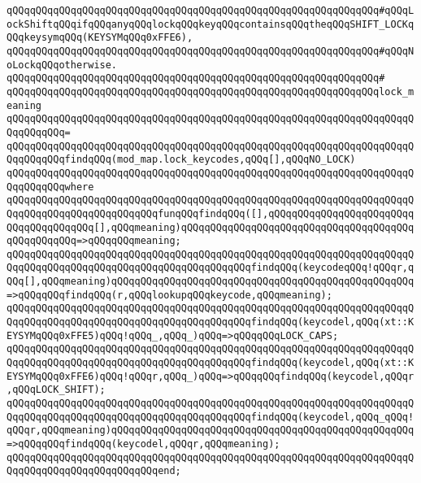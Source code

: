 \verb|qQQqqQQqqQQqqQQqqQQqqQQqqQQqqQQqqQQqqQQqqQQqqQQqqQQqqQQqqQQqqQQq#qQQqLockShiftqQQqifqQQqanyqQQqlockqQQqkeyqQQqcontainsqQQqtheqQQqSHIFT_LOCKqQQqkeysymqQQq(KEYSYMqQQq0xFFE6),|\newline
\verb|qQQqqQQqqQQqqQQqqQQqqQQqqQQqqQQqqQQqqQQqqQQqqQQqqQQqqQQqqQQqqQQq#qQQqNoLockqQQqotherwise.|\newline
\verb|qQQqqQQqqQQqqQQqqQQqqQQqqQQqqQQqqQQqqQQqqQQqqQQqqQQqqQQqqQQqqQQq#|\newline
\verb|qQQqqQQqqQQqqQQqqQQqqQQqqQQqqQQqqQQqqQQqqQQqqQQqqQQqqQQqqQQqqQQqlock_meaning|\newline
\verb|qQQqqQQqqQQqqQQqqQQqqQQqqQQqqQQqqQQqqQQqqQQqqQQqqQQqqQQqqQQqqQQqqQQqqQQqqQQqqQQq=|\newline
\verb|qQQqqQQqqQQqqQQqqQQqqQQqqQQqqQQqqQQqqQQqqQQqqQQqqQQqqQQqqQQqqQQqqQQqqQQqqQQqqQQqfindqQQq(mod_map.lock_keycodes,qQQq[],qQQqNO_LOCK)|\newline
\verb|qQQqqQQqqQQqqQQqqQQqqQQqqQQqqQQqqQQqqQQqqQQqqQQqqQQqqQQqqQQqqQQqqQQqqQQqqQQqqQQqwhere|\newline
\verb|qQQqqQQqqQQqqQQqqQQqqQQqqQQqqQQqqQQqqQQqqQQqqQQqqQQqqQQqqQQqqQQqqQQqqQQqqQQqqQQqqQQqqQQqqQQqqQQqfunqQQqfindqQQq([],qQQqqQQqqQQqqQQqqQQqqQQqqQQqqQQqqQQqqQQq[],qQQqmeaning)qQQqqQQqqQQqqQQqqQQqqQQqqQQqqQQqqQQqqQQqqQQqqQQqqQQq=>qQQqqQQqmeaning;|\newline
\verb|qQQqqQQqqQQqqQQqqQQqqQQqqQQqqQQqqQQqqQQqqQQqqQQqqQQqqQQqqQQqqQQqqQQqqQQqqQQqqQQqqQQqqQQqqQQqqQQqqQQqqQQqqQQqqQQqfindqQQq(keycodeqQQq!qQQqr,qQQq[],qQQqmeaning)qQQqqQQqqQQqqQQqqQQqqQQqqQQqqQQqqQQqqQQqqQQqqQQqqQQq=>qQQqqQQqfindqQQq(r,qQQqlookupqQQqkeycode,qQQqmeaning);|\newline
\verb|qQQqqQQqqQQqqQQqqQQqqQQqqQQqqQQqqQQqqQQqqQQqqQQqqQQqqQQqqQQqqQQqqQQqqQQqqQQqqQQqqQQqqQQqqQQqqQQqqQQqqQQqqQQqqQQqfindqQQq(keycodel,qQQq(xt::KEYSYMqQQq0xFFE5)qQQq!qQQq_,qQQq_)qQQq=>qQQqqQQqLOCK_CAPS;|\newline
\verb|qQQqqQQqqQQqqQQqqQQqqQQqqQQqqQQqqQQqqQQqqQQqqQQqqQQqqQQqqQQqqQQqqQQqqQQqqQQqqQQqqQQqqQQqqQQqqQQqqQQqqQQqqQQqqQQqfindqQQq(keycodel,qQQq(xt::KEYSYMqQQq0xFFE6)qQQq!qQQqr,qQQq_)qQQq=>qQQqqQQqfindqQQq(keycodel,qQQqr,qQQqLOCK_SHIFT);|\newline
\verb|qQQqqQQqqQQqqQQqqQQqqQQqqQQqqQQqqQQqqQQqqQQqqQQqqQQqqQQqqQQqqQQqqQQqqQQqqQQqqQQqqQQqqQQqqQQqqQQqqQQqqQQqqQQqqQQqfindqQQq(keycodel,qQQq_qQQq!qQQqr,qQQqmeaning)qQQqqQQqqQQqqQQqqQQqqQQqqQQqqQQqqQQqqQQqqQQqqQQqqQQq=>qQQqqQQqfindqQQq(keycodel,qQQqr,qQQqmeaning);|\newline
\verb|qQQqqQQqqQQqqQQqqQQqqQQqqQQqqQQqqQQqqQQqqQQqqQQqqQQqqQQqqQQqqQQqqQQqqQQqqQQqqQQqqQQqqQQqqQQqqQQqend;|\newline
